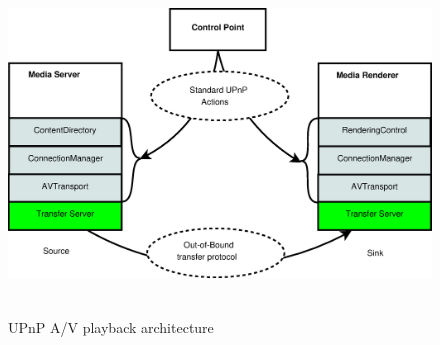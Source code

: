 \begin{figure}[htb] 
\centering \includegraphics[height=9cm]{charts/upnp_playback} 
\caption{UPnP A/V playback architecture \label{upnp_playback}} 
\end{figure} 

